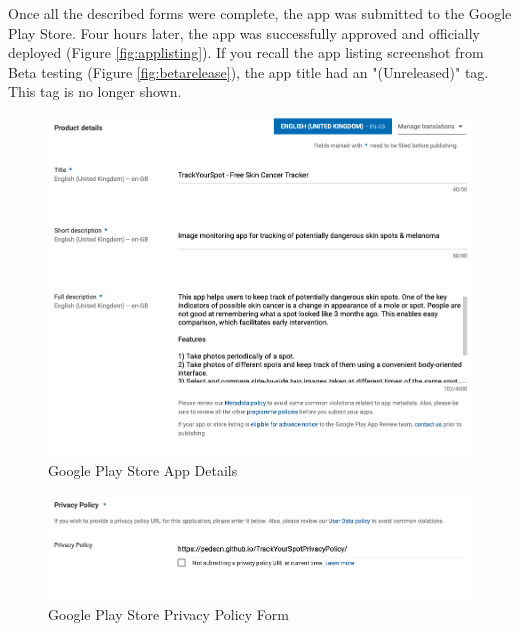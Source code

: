 Once all the described forms were complete, the app was submitted to the Google Play Store. Four hours later, the app was successfully approved and officially deployed (Figure \ref{fig:applisting}). If you recall the app listing screenshot from Beta testing (Figure \ref{fig:betarelease}), the app title had an "(Unreleased)" tag. This tag is no longer shown.

\begin{figure}
    \includegraphics[width=1\textwidth, center]{figures/appnaming.png}
    \caption{Google Play Store App Details}
    \label{fig:appdetailsform}
\end{figure}

\begin{figure}
    \includegraphics[width=1\textwidth, center]{figures/appprivacypolicy.png}
    \caption{Google Play Store Privacy Policy Form}
    \label{fig:privacypolicy}
\end{figure}

